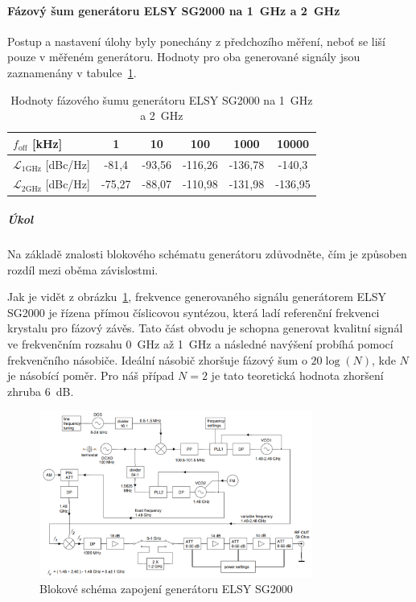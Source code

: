 \documentclass[11pt,a4paper]{article}
\begin{document}
\paragraph*{Fázový šum generátoru ELSY SG2000 na 1~GHz a 2~GHz} Postup a nastavení úlohy byly ponechány z předchozího měření, neboť se liší pouze v měřeném generátoru. Hodnoty pro oba generované signály jsou zaznamenány v tabulce~\ref{table:phase-noise-ELSY}.

\begin{table}[!ht]
\begin{center}
\begin{tabular}{| l || c | c | c | c | c |}
    \hline
    $f_{\mathrm{off}}$ [kHz] & 1 & 10 & 100 & 1000 & 10000 \\
    \hline
    $\mathcal L_{1\mathrm{GHz}}$ [dBc/Hz] & -81,4 & -93,56 & -116,26 & -136,78 & -140,3 \\
    \hline
    $\mathcal L_{2\mathrm{GHz}}$ [dBc/Hz] & -75,27 & -88,07 & -110,98 & -131,98 & -136,95 \\
    \hline
\end{tabular}
\caption{Hodnoty fázového šumu generátoru ELSY SG2000 na 1~GHz a 2~GHz}
\label{table:phase-noise-ELSY}
\end{center}
\end{table}

\subparagraph*{Úkol} Na základě znalosti blokového schématu generátoru zdůvodněte, čím je způsoben rozdíl mezi oběma závislostmi.

Jak je vidět z obrázku~\ref{fig:elsy-sg2000-connection-scheme}, frekvence generovaného signálu generátorem ELSY SG2000 je řízena přímou číslicovou syntézou, která ladí referenční frekvenci krystalu pro fázový závěs. Tato část obvodu je schopna generovat kvalitní signál ve frekvenčním rozsahu 0~GHz až 1~GHz a následné navýšení probíhá pomocí frekvenčního násobiče. Ideální násobič zhoršuje fázový šum o $20 \log(N)$, kde $N$ je násobící poměr. Pro náš případ $N=2$ je tato teoretická hodnota zhoršení zhruba 6~dB.

\begin{figure}[!ht]
\begin{center}
    \includegraphics[width=0.8\textwidth]{src/elsy-sg2000_connection-scheme.png}
\end{center}
\caption{Blokové schéma zapojení generátoru ELSY SG2000}
\label{fig:elsy-sg2000-connection-scheme}
\end{figure}
\end{document}
